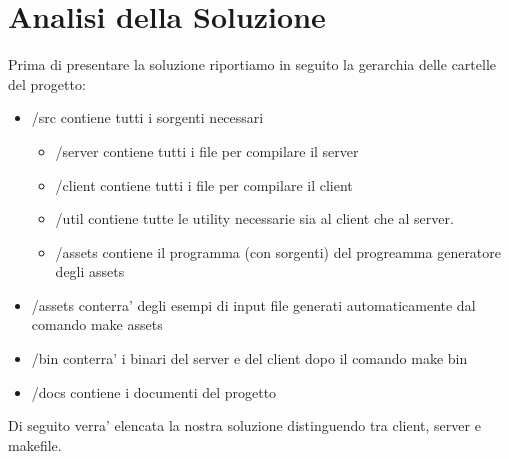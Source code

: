\documentclass[12pt]{article}
\begin{document}
\section{Analisi della Soluzione}
Prima di presentare la soluzione riportiamo in seguito la gerarchia delle cartelle del progetto:
\begin{itemize}
    \item /src contiene tutti i sorgenti necessari
    \begin{itemize}
        \item /server contiene tutti i file per compilare il server
        \item /client contiene tutti i file per compilare il client
        \item /util contiene tutte le utility necessarie sia al client che al server.
        \item /assets contiene il programma (con sorgenti) del progreamma generatore degli assets
    \end{itemize}
    \item /assets conterra' degli esempi di input file generati automaticamente dal comando make assets
    \item /bin conterra' i binari del server e del client dopo il comando make bin
    \item /docs contiene i documenti del progetto
\end{itemize}

Di seguito verra' elencata la nostra soluzione distinguendo tra client, server e makefile.
\end{document}
